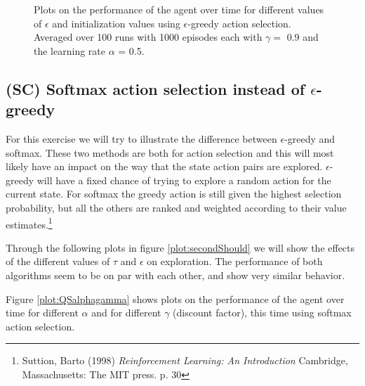 \documentclass{article}
\begin{document}
\begin{figure}[ht]
{    \label{fig:secondMust_nrSteps_detail}
}
\caption{Plots on the performance of the agent over time for different values of $\epsilon$ and initialization values using $\epsilon$-greedy action selection. Averaged over 100 runs with 1000 episodes each with $\gamma = $ 0.9 and the learning rate $\alpha$ = 0.5.}
\label{plot:secondMust}
\end{figure}

\subsection{(SC) Softmax action selection instead of $\epsilon$-greedy}\label{sec:exercise3}
For this exercise we will try to illustrate the difference between $\epsilon$-greedy and softmax. These two methods are both for action selection and this will most likely have an impact on the way that the state action pairs are explored. $\epsilon$-greedy will have a fixed chance of trying to explore a random action for the current state. For softmax the greedy action is still given the highest selection probability, but all the others are ranked and weighted according to their value estimates.\footnote{Suttion, Barto (1998) \textit{Reinforcement Learning: An Introduction} Cambridge, Massachusetts: The MIT press. p. 30} 

Through the following plots in figure \ref{plot:secondShould} we will show the effects of the different values of $\tau$ and $\epsilon$ on exploration. The performance of both algorithms seem to be on par with each other, and show very similar behavior. 

Figure \ref{plot:QSalphagamma} shows plots on the performance of the agent over time for different $\alpha$ and for different $\gamma$ (discount factor), this time using softmax action selection.
\end{document}
